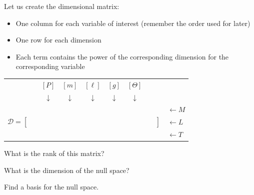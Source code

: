\begin{slide}

\begin{parts}
\setcounter{partsitem}{1}

	\item Let us create the dimensional matrix:
	\begin{itemize}
		\item One column for each variable of interest (remember the order used for later)
		\item One row for each dimension
		\item Each term contains the power of the corresponding dimension for the corresponding variable
	\end{itemize}
	
	\begin{center}
	\begin{tabular}{cccccccl}
		& $[P]$ & $[m]$ & $[\ell]$ & $[g]$ & $[\Theta]$ & \\
		& $\downarrow$ & $\downarrow$ & $\downarrow$ & $\downarrow$ & $\downarrow$ & \\
	\multirow{3}{*}{$\mathcal{D}=\left[\begin{matrix} \, \\ \,\\ \, \end{matrix}\right.$} 
		& & & & & & 
		\multirow{3}{*}{$\left.\begin{matrix} \, \\ \,\\ \, \end{matrix}\right]$}
		& $\leftarrow M$
		\\
		& & & & & & & $\leftarrow L$ \\
		& & & & & & & $\leftarrow T$
	\end{tabular}
	\end{center}
	
	\item What is the rank of this matrix?
	\item What is the dimension of the null space? %
	\item Find a basis for the null space.

\end{parts}

\end{slide}

